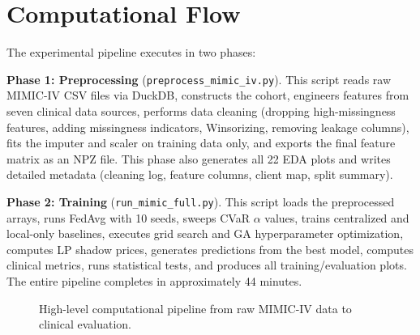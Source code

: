 \documentclass[11pt,a4paper]{report}
\begin{document}
\section{Computational Flow}

The experimental pipeline executes in two phases:

\textbf{Phase 1: Preprocessing} (\texttt{preprocess\_mimic\_iv.py}). This script reads raw MIMIC-IV CSV files via DuckDB, constructs the cohort, engineers features from seven clinical data sources, performs data cleaning (dropping high-missingness features, adding missingness indicators, Winsorizing, removing leakage columns), fits the imputer and scaler on training data only, and exports the final feature matrix as an NPZ file. This phase also generates all 22 EDA plots and writes detailed metadata (cleaning log, feature columns, client map, split summary).

\textbf{Phase 2: Training} (\texttt{run\_mimic\_full.py}). This script loads the preprocessed arrays, runs FedAvg with 10 seeds, sweeps CVaR $\alpha$ values, trains centralized and local-only baselines, executes grid search and GA hyperparameter optimization, computes LP shadow prices, generates predictions from the best model, computes clinical metrics, runs statistical tests, and produces all training/evaluation plots. The entire pipeline completes in approximately 44 minutes.

\begin{figure}[H]
\centering
{}
\caption{High-level computational pipeline from raw MIMIC-IV data to clinical evaluation.}
\label{fig:pipeline}
\end{figure}
\end{document}

